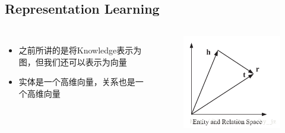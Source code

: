 \subsection*{Representation Learning}

\begin{frame}

	\begin{columns}
			\begin{itemize}
				\item 之前所讲的是将Knowledge表示为图，但我们还可以表示为向量
				\item 实体是一个高维向量，关系也是一个高维向量			
			\end{itemize}
			\begin{figure}[htbp]
				\centering
				\includegraphics[width=1\textwidth, bb= 0 0 400 400]{pic/kg/transE.png}
			\end{figure}
	\end{columns}
	 
\end{frame}

